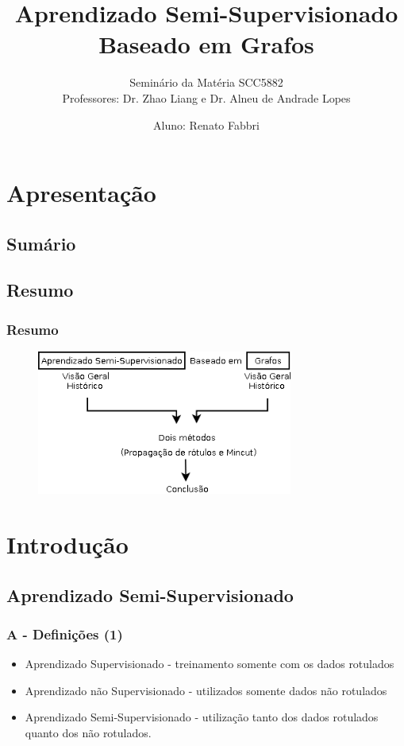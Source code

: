 \documentclass{beamer}
\title{Aprendizado Semi-Supervisionado Baseado em Grafos}
\subtitle{Seminário da Matéria SCC5882 \\ Professores: Dr. Zhao Liang e Dr. Alneu de Andrade Lopes}
\author{Aluno: Renato Fabbri}
\begin{document}
  \frame{\titlepage}
  \section{Apresentação}
    \subsection{Sumário}
      \frame{\tableofcontents}
    \subsection{Resumo}
      \frame
      {
        \frametitle{Resumo}
        \begin{figure}[!h]
          \begin{center}
                  \includegraphics[width=0.75\textwidth]{Diagram1}
          \end{center}
        \end{figure}
      }

  \section{Introdução}
    \frame{\tableofcontents[current]}

    \subsection{Aprendizado Semi-Supervisionado}
      \frame
      {
        \frametitle{A - Definições (1)}
        \begin{itemize}
          \item <1-> Aprendizado Supervisionado - treinamento somente com os dados rotulados
          \item <2-> Aprendizado não Supervisionado - utilizados somente dados não rotulados
          \item <3-> Aprendizado Semi-Supervisionado - utilização tanto dos dados rotulados quanto dos não rotulados.
        \end{itemize}
      }
\end{document}
